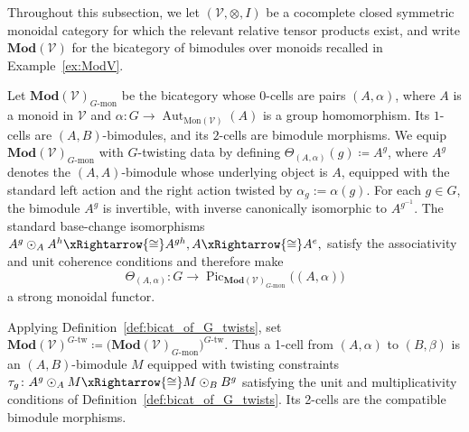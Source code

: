 \documentclass[11pt,oneside]{amsart}
\numberwithin{equation}{section}
\numberwithin{figure}{section}
\theoremstyle{plain}
\theoremstyle{definition}
\theoremstyle{remark}
\begin{document}
Throughout this subsection, we let $(\mathcal V,\otimes,I)$ be a cocomplete closed symmetric monoidal category for which the relevant relative tensor products exist, and write  $\mathbf{Mod}(\mathcal V)$  for the bicategory of bimodules over monoids recalled in Example~\ref{ex:ModV}.




 Let $\mathbf{Mod}(\mathcal{V})_{G\text{-mon}}$ be the bicategory whose $0$-cells are pairs $(A, \alpha)$, where $A$ is a monoid in $\mathcal{V}$ and $\alpha\colon G\to \operatorname{Aut}_{\mathrm{Mon}(\mathcal{V})}(A)$ is a group homomorphism. Its \(1\)-cells are \((A,B)\)-bimodules, and its \(2\)-cells are
bimodule morphisms.
We equip $\mathbf{Mod}(\mathcal{V})_{G\text{-mon}}$ with $G$-twisting data by defining   $\Theta_{(A,\alpha)}(g) \coloneqq A^g$, where $A^g$ denotes the $(A,A)$-bimodule whose underlying object is $A$, equipped with the standard left action and the right action twisted by $\alpha_g:= \alpha(g)$.
For each \(g\in G\), the bimodule \(A^g\) is invertible, with inverse
canonically isomorphic to \(A^{g^{-1}}\). The standard base-change
isomorphisms
\(
A^g\odot_A A^h\xRightarrow{\cong}A^{gh},
A\xRightarrow{\cong}A^e,
\)
satisfy the associativity and unit coherence conditions and therefore
make
\[
\Theta_{(A,\alpha)}
\colon
G\longrightarrow \operatorname{Pic}_{\mathbf{Mod}(\mathcal V)_{G\text{-mon}}}
\bigl((A,\alpha)\bigr)
\]
a strong monoidal functor.

Applying Definition~\ref{def:bicat_of_G_twists}, set
\(
\mathbf{Mod}(\mathcal V)^{G\text{-tw}}
\coloneqq
\bigl(\mathbf{Mod}(\mathcal V)_{G\text{-mon}}\bigr)^{G\text{-tw}}.
\)
Thus a 1-cell from \((A,\alpha)\) to \((B,\beta)\) is an \((A,B)\)-bimodule \(M\) equipped with twisting constraints
\(
\tau_g\colon A^g\odot_A M \xRightarrow{\cong} M\odot_B B^g
\)
satisfying the unit and multiplicativity conditions of Definition~\ref{def:bicat_of_G_twists}. Its 2-cells are the compatible bimodule morphisms.
\end{document}
